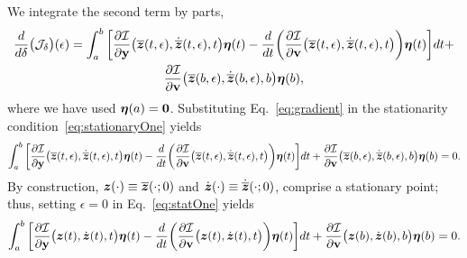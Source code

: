 \documentclass[3p,computermodern,10pt]{elsarticle}
\begin{document}
\begin{appendices}
We integrate the second term by parts,
\begin{multline}\label{eq:gradient}
\frac{d}{d\delta} \big( \mathcal{J}_{\delta} \big)(\epsilon)
	=  \int_a^b  \bigg[\frac{\partial \mathcal{I}  }{\partial \mathbf{y} }
	\big(\overline{\boldsymbol z}(t,\epsilon),\dot{\overline{\boldsymbol z}}(t,\epsilon) , t \big)
	\boldsymbol \eta(t) - \frac{d}{dt}\bigg( \frac{\partial \mathcal{I}}{\partial
	\mathbf{{v}} }  \big(\overline{\boldsymbol z}(t,\epsilon),\dot{\overline{\boldsymbol z}}(t,\epsilon)
	,t \big) \bigg) \boldsymbol \eta(t) \bigg]dt + \\ 
\frac{\partial \mathcal{I}}{\partial \mathbf{{v}}} \big(\overline{\boldsymbol z}(b,\epsilon),\dot{\overline{\boldsymbol z}}(b,\epsilon) ,b \big) \boldsymbol \eta(b) , 
\end{multline}
where we have used $\boldsymbol \eta(a) = \boldsymbol 0$.
Substituting Eq.~\eqref{eq:gradient} in the stationarity condition~\eqref{eq:stationaryOne} yields
\begin{equation}\label{eq:statOne}
  \int_a^b  \bigg[\frac{\partial \mathcal{I}  }{\partial \mathbf{y} } \big(\overline{\boldsymbol z}(t,\epsilon),\dot{\overline{\boldsymbol z}}(t,\epsilon),t \big) \boldsymbol \eta(t) - \frac{d}{dt}\bigg( \frac{\partial \mathcal{I}}{\partial \mathbf{{v}} }  \big(\overline{\boldsymbol z}(t,\epsilon),\dot{\overline{\boldsymbol z}}(t,\epsilon),t \big) \bigg) \boldsymbol \eta(t) \bigg]dt + \frac{\partial \mathcal{I}}{\partial \mathbf{{v}}} \big(\overline{\boldsymbol z}(b,\epsilon),\dot{\overline{\boldsymbol z}}(b,\epsilon),b \big) \boldsymbol \eta(b)  = 0. 
\end{equation}
By construction, $\boldsymbol z(\cdot) \equiv \overline{\boldsymbol z}(\cdot;0)$ and $\dot{\boldsymbol z}(\cdot) \equiv \dot{\overline{\boldsymbol z}}(\cdot;0)$, comprise a stationary
point; thus, setting $\epsilon = 0$ in Eq.~\eqref{eq:statOne} yields
\begin{equation}\label{eq:euler_lagrange_analysis}
  \int_a^b  \bigg[\frac{\partial \mathcal{I}  }{\partial \mathbf{y} } \big(\boldsymbol z(t),\dot{\boldsymbol z}(t),t \big) \boldsymbol \eta(t) - \frac{d}{dt}\bigg( \frac{\partial \mathcal{I}}{\partial \mathbf{{v}} }  \big(\boldsymbol z(t),\dot{\boldsymbol z}(t),t \big) \bigg) \boldsymbol \eta(t) \bigg]dt + \frac{\partial \mathcal{I}}{\partial \mathbf{{v}}} \big(\boldsymbol z(b),\dot{\boldsymbol z}(b) ,b\big) \boldsymbol \eta(b)  = 0. 
\end{equation}

\end{appendices}
\end{document}

